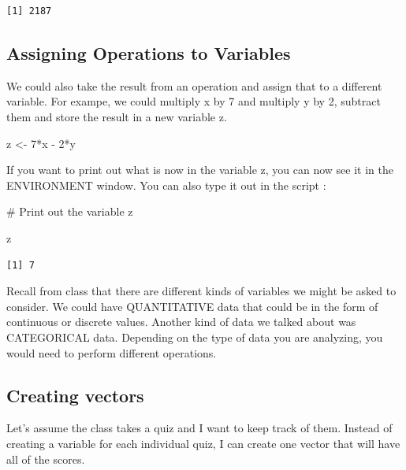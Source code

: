 \documentclass[
  letterpaper,
  DIV=11,
  numbers=noendperiod]{scrreprt}
\newenvironment{Shaded}{\begin{snugshade}}{\end{snugshade}}
\newcommand{\CommentTok}[1]{\textcolor[rgb]{0.37,0.37,0.37}{#1}}
\newcommand{\DecValTok}[1]{\textcolor[rgb]{0.68,0.00,0.00}{#1}}
\newcommand{\NormalTok}[1]{\textcolor[rgb]{0.00,0.23,0.31}{#1}}
\newcommand{\OtherTok}[1]{\textcolor[rgb]{0.00,0.23,0.31}{#1}}
\newcommand{\SpecialCharTok}[1]{\textcolor[rgb]{0.37,0.37,0.37}{#1}}
\begin{document}
\begin{verbatim}
[1] 2187
\end{verbatim}

\subsection*{Assigning Operations to
Variables}\label{assigning-operations-to-variables}

We could also take the result from an operation and assign that to a
different variable. For exampe, we could multiply x by 7 and multiply y
by 2, subtract them and store the result in a new variable z.

\begin{Shaded}
\begin{Highlighting}[]
\NormalTok{z }\OtherTok{\textless{}{-}} \DecValTok{7}\SpecialCharTok{*}\NormalTok{x }\SpecialCharTok{{-}} \DecValTok{2}\SpecialCharTok{*}\NormalTok{y}
\end{Highlighting}
\end{Shaded}

If you want to print out what is now in the variable z, you can now see
it in the ENVIRONMENT window. You can also type it out in the script :

\begin{Shaded}
\begin{Highlighting}[]
\CommentTok{\# Print out the variable z}

\NormalTok{z}
\end{Highlighting}
\end{Shaded}

\begin{verbatim}
[1] 7
\end{verbatim}

Recall from class that there are different kinds of variables we might
be asked to consider. We could have QUANTITATIVE data that could be in
the form of continuous or discrete values. Another kind of data we
talked about was CATEGORICAL data. Depending on the type of data you are
analyzing, you would need to perform different operations.

\subsection*{Creating vectors}\label{creating-vectors}

Let's assume the class takes a quiz and I want to keep track of them.
Instead of creating a variable for each individual quiz, I can create
one vector that will have all of the scores.
\end{document}
